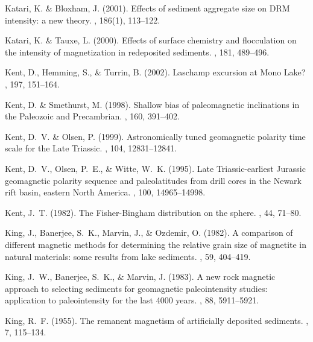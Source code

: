 Katari, K. \& Bloxham, J. (2001).
\newblock Effects of sediment aggregate size on DRM intensity: a new theory.
, 186(1), 113--122.

Katari, K. \& Tauxe, L. (2000).
\newblock Effects of surface chemistry and flocculation on the intensity of
  magnetization in redeposited sediments.
, 181, 489--496.

Kent, D., Hemming, S., \& Turrin, B. (2002).
\newblock Laschamp excursion at Mono Lake?
, 197, 151--164.

Kent, D. \& Smethurst, M. (1998).
\newblock Shallow bias of paleomagnetic inclinations in the Paleozoic and
  Precambrian.
, 160, 391--402.

Kent, D.~V. \& Olsen, P. (1999).
\newblock Astronomically tuned geomagnetic polarity time scale for the Late
  Triassic.
, 104, 12831--12841.

Kent, D.~V., Olsen, P.~E., \& Witte, W.~K. (1995).
\newblock Late Triassic-earliest Jurassic geomagnetic polarity sequence and
  paleolatitudes from drill cores in the Newark rift basin, eastern North
  America.
, 100, 14965--14998.

Kent, J.~T. (1982).
\newblock The Fisher-Bingham distribution on the sphere.
, 44, 71--80.

King, J., Banerjee, S.~K., Marvin, J., \& Ozdemir, O. (1982).
\newblock A comparison of different magnetic methods for determining the
  relative grain size of magnetite in natural materials: some results from lake
  sediments.
, 59, 404--419.

King, J.~W., Banerjee, S.~K., \& Marvin, J. (1983).
\newblock A new rock magnetic approach to selecting sediments for geomagnetic
  paleointensity studies: application to paleointensity for the last 4000
  years.
, 88, 5911--5921.

King, R.~F. (1955).
\newblock The remanent magnetism of artificially deposited sediments.
, 7, 115--134.

